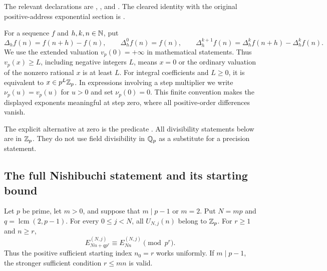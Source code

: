 The relevant declarations are
,
, and
.
The cleared identity with the original positive-address exponential section
is .

\begin{definition}\label{def:arith-precision}
For a sequence $f$ and $h,k,n\in\mathbb N$, put
\[
 \Delta_h f(n)=f(n+h)-f(n),\qquad
 \Delta_h^0 f(n)=f(n),\qquad
 \Delta_h^{k+1}f(n)=\Delta_h^k f(n+h)-\Delta_h^k f(n).
\]
We use the extended valuation $v_p(0)=+\infty$ in mathematical statements.
Thus $v_p(x)\ge L$, including negative integers $L$, means
$x=0$ or the ordinary valuation of the nonzero rational $x$ is at least $L$.
For integral coefficients and $L\ge0$, it is equivalent to
$x\in p^L\mathbb Z_p$.  In expressions involving a step multiplier we write
$\nu_p(u)=v_p(u)$ for $u>0$ and set $\nu_p(0)=0$.  This finite convention
makes the displayed exponents meaningful at step zero, where all
positive-order differences vanish.
\end{definition}

The explicit alternative at zero is the predicate
.  All divisibility
statements below are in $\mathbb Z_p$.  They do not use field divisibility in
$\mathbb Q_p$ as a substitute for a precision statement.

\subsection{The full Nishibuchi statement and its starting bound}

\begin{theorem}\label{thm:arith-nishibuchi}
Let $p$ be prime, let $m>0$, and suppose that $m\mid p-1$ or $m=2$.
Put $N=mp$ and $q=\operatorname{lcm}(2,p-1)$.  For every $0\le j<N$,
all $U_{N,j}(n)$ belong to $\mathbb Z_p$.  For $r\ge1$ and $n\ge r$,
\begin{equation}\label{eq:arith-nishibuchi}
 E_{Nn+qp^r}^{(N,j)}\equiv E_{Nn}^{(N,j)}\pmod{p^r}.
\end{equation}
Thus the positive sufficient starting index $n_0=r$ works uniformly.
If $m\mid p-1$, the stronger sufficient condition $r\le mn$ is valid.
\end{theorem}

